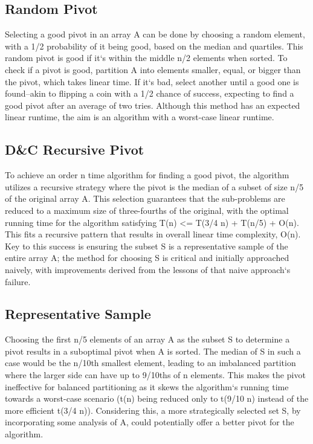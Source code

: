 \subsection*{Random Pivot}
Selecting a good pivot in an array A can be done by choosing a random element, with a 1/2 probability of it being good, based on the median and quartiles.
This random pivot is good if it`s within the middle n/2 elements when sorted.
To check if a pivot is good, partition A into elements smaller, equal, or bigger than the pivot, which takes linear time.
If it`s bad, select another until a good one is found--akin to flipping a coin with a 1/2 chance of success, expecting to find a good pivot after an average of two tries.
Although this method has an expected linear runtime, the aim is an algorithm with a worst-case linear runtime.

\subsection*{D\&C  Recursive Pivot}
To achieve an order n time algorithm for finding a good pivot, the algorithm utilizes a recursive strategy where the pivot is the median of a subset of size n/5 of the original array A\@.
This selection guarantees that the sub-problems are reduced to a maximum size of three-fourths of the original, with the optimal running time for the algorithm satisfying T(n) \textless{}= T(3/4 n) + T(n/5) + O(n).
This fits a recursive pattern that results in overall linear time complexity, O(n).
Key to this success is ensuring the subset S is a representative sample of the entire array A; the method for choosing S is critical and initially approached naively, with improvements derived from the lessons of that naive approach`s failure.

\subsection*{Representative Sample}
Choosing the first n/5 elements of an array A as the subset S to determine a pivot results in a suboptimal pivot when A is sorted.
The median of S in such a case would be the n/10th smallest element, leading to an imbalanced partition where the larger side can have up to 9/10ths of n elements.
This makes the pivot ineffective for balanced partitioning as it skews the algorithm`s running time towards a worst-case scenario (t(n) being reduced only to t(9/10 n) instead of the more efficient t(3/4 n)).
Considering this, a more strategically selected set S, by incorporating some analysis of A, could potentially offer a better pivot for the algorithm.

